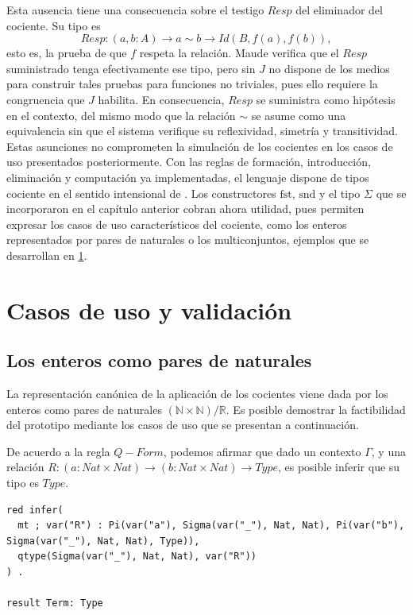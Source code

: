 Esta ausencia tiene una consecuencia sobre el testigo $Resp$ del eliminador del cociente. Su tipo es
\[
  Resp : (a, b : A) \to a \sim b \to Id(B, f(a), f(b)),
\]
esto es, la prueba de que $f$ respeta la relación. Maude verifica que el $Resp$ suministrado tenga efectivamente ese tipo, pero sin $J$ no dispone de los medios para construir tales pruebas para funciones no triviales, pues ello requiere la congruencia que $J$ habilita. En consecuencia, $Resp$ se suministra como hipótesis en el contexto, del mismo modo que la relación $\sim$ se asume como una equivalencia sin que el sistema verifique su reflexividad, simetría y transitividad. Estas asunciones no comprometen la simulación de los cocientes en los casos de uso presentados posteriormente.
\newline
\indent Con las reglas de formación, introducción, eliminación y computación ya implementadas, el lenguaje dispone de tipos cociente en el sentido intensional de \cite{nuoli}. Los constructores $\mathrm{fst}$, $\mathrm{snd}$ y el tipo $\Sigma$ que se incorporaron en el capítulo anterior cobran ahora utilidad, pues permiten expresar los casos de uso característicos del cociente, como los enteros representados por pares de naturales o los multiconjuntos, ejemplos que se desarrollan en \cref{ch:casos}.

\chapter{Casos de uso y validación}\label{ch:casos}

\section{Los enteros como pares de naturales}
La representación canónica de la aplicación de los cocientes viene dada por los enteros como pares de naturales $(\mathbb{N} \times \mathbb{N}) / \mathbb{R}$. Es posible demostrar la factibilidad del prototipo mediante los casos de uso que se presentan a continuación.

De acuerdo a la regla $Q-Form$, podemos afirmar que dado un contexto $\Gamma$, y una relación $R : (a : Nat \times Nat) \to (b : Nat \times Nat) \to Type$, es posible inferir que su tipo es $Type$.
\begin{lstlisting}
red infer(
  mt ; var("R") : Pi(var("a"), Sigma(var("_"), Nat, Nat), Pi(var("b"), Sigma(var("_"), Nat, Nat), Type)),
  qtype(Sigma(var("_"), Nat, Nat), var("R"))
) .

result Term: Type
\end{lstlisting}

